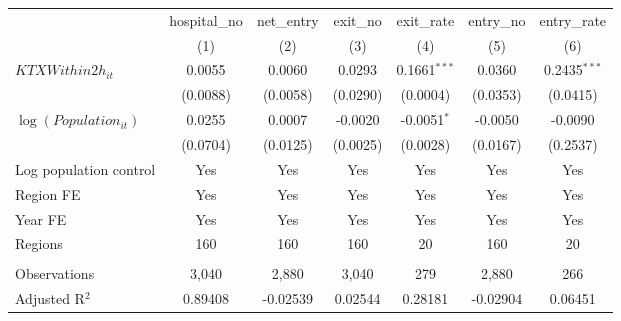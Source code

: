 \begingroup
\centering
\begin{tabular}{lcccccc}
   \toprule
                            & hospital\_no  & net\_entry  & exit\_no  & exit\_rate     & entry\_no  & entry\_rate \\    
                            & (1)           & (2)         & (3)       & (4)            & (5)        & (6)\\  
   \midrule 
   $KTXWithin2h_{it}$       & 0.0055        & 0.0060      & 0.0293    & 0.1661$^{***}$ & 0.0360     & 0.2435$^{***}$\\   
                            & (0.0088)      & (0.0058)    & (0.0290)  & (0.0004)       & (0.0353)   & (0.0415)\\   
   $\log(Population_{it})$  & 0.0255        & 0.0007      & -0.0020   & -0.0051$^{*}$  & -0.0050    & -0.0090\\   
                            & (0.0704)      & (0.0125)    & (0.0025)  & (0.0028)       & (0.0167)   & (0.2537)\\   
   Log population control   & Yes           & Yes         & Yes       & Yes            & Yes        & Yes\\  
   Region FE                & Yes           & Yes         & Yes       & Yes            & Yes        & Yes\\  
   Year FE                  & Yes           & Yes         & Yes       & Yes            & Yes        & Yes\\  
   Regions                  & 160           & 160         & 160       & 20             & 160        & 20\\  
    \\
   Observations             & 3,040         & 2,880       & 3,040     & 279            & 2,880      & 266\\  
   Adjusted R$^2$           & 0.89408       & -0.02539    & 0.02544   & 0.28181        & -0.02904   & 0.06451\\  
   \bottomrule
\end{tabular}
\par\endgroup
